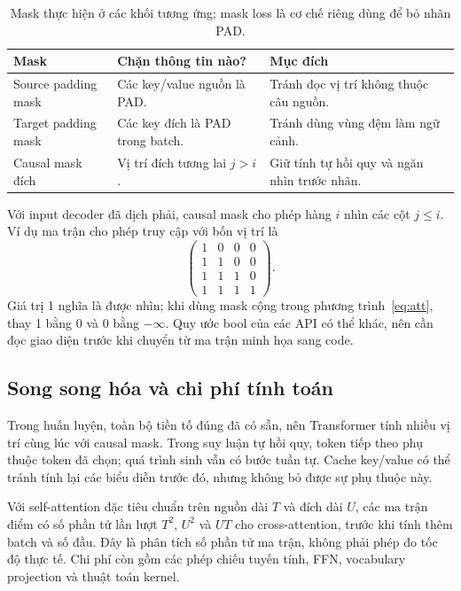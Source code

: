 \documentclass[11pt,a4paper]{article}
\numberwithin{equation}{section}
\begin{document}
\begin{table}[H]
\centering\small
\begin{tabularx}{\linewidth}{@{}p{3.5cm}YY@{}}
\toprule{}Mask & Chặn thông tin nào? & Mục đích\\\midrule
Source padding mask & Các key/value nguồn là PAD. & Tránh đọc vị trí không thuộc câu nguồn.\\
Target padding mask & Các key đích là PAD trong batch. & Tránh dùng vùng đệm làm ngữ cảnh.\\
Causal mask đích & Vị trí đích tương lai $j>i$. & Giữ tính tự hồi quy và ngăn nhìn trước nhãn.\\
\bottomrule
\end{tabularx}
\caption{Mask thực hiện ở các khối tương ứng; mask loss là cơ chế riêng dùng để bỏ nhãn PAD.}
\end{table}
Với input decoder đã dịch phải, causal mask cho phép hàng $i$ nhìn các cột $j\leq i$. Ví dụ ma trận cho phép truy cập với bốn vị trí là
\begin{equation*}
\begin{pmatrix}1&0&0&0\\1&1&0&0\\1&1&1&0\\1&1&1&1\end{pmatrix}.
\end{equation*}
Giá trị 1 nghĩa là được nhìn; khi dùng mask cộng trong phương trình~\eqref{eq:att}, thay 1 bằng 0 và 0 bằng $-\infty$. Quy ước bool của các API có thể khác, nên cần đọc giao diện trước khi chuyển từ ma trận minh họa sang code.

\subsection{Song song hóa và chi phí tính toán}
Trong huấn luyện, toàn bộ tiền tố đúng đã có sẵn, nên Transformer tính nhiều vị trí cùng lúc với causal mask. Trong suy luận tự hồi quy, token tiếp theo phụ thuộc token đã chọn; quá trình sinh vẫn có bước tuần tự. Cache key/value có thể tránh tính lại các biểu diễn trước đó, nhưng không bỏ được sự phụ thuộc này.

Với self-attention đặc tiêu chuẩn trên nguồn dài $T$ và đích dài $U$, các ma trận điểm có số phần tử lần lượt $T^2$, $U^2$ và $UT$ cho cross-attention, trước khi tính thêm batch và số đầu. Đây là phân tích số phần tử ma trận, không phải phép đo tốc độ thực tế. Chi phí còn gồm các phép chiếu tuyến tính, FFN, vocabulary projection và thuật toán kernel.
\end{document}
